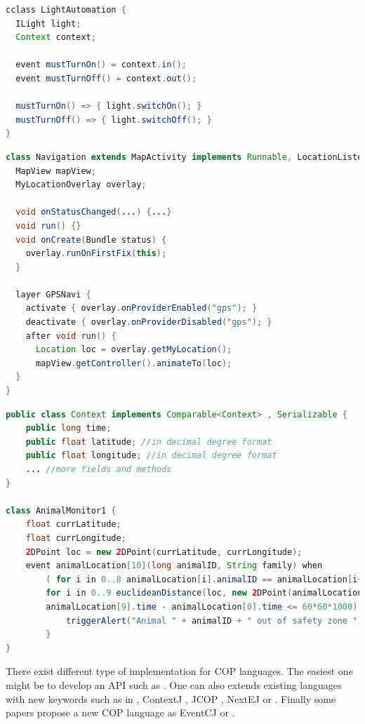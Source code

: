 \documentclass[a4paper]{article}
\begin{document}
\begin{lstlisting}[float, language=Java, caption=ECaesarJ context use, label={listing:ecaesarjcontextuse}]
cclass LightAutomation {
  ILight light;
  Context context;

  event mustTurnOn() = context.in();
  event mustTurnOff() = context.out();

  mustTurnOn() => { light.switchOn(); }
  mustTurnOff() => { light.switchOff(); }
}
\end{lstlisting}

\begin{lstlisting}[float, language=Java, caption=EventCJ context-dependent behaviour, label={listing:eventcjlayeruse}]
class Navigation extends MapActivity implements Runnable, LocationListener {
  MapView mapView;
  MyLocationOverlay overlay;
    
  void onStatusChanged(...) {...}
  void run() {}
  void onCreate(Bundle status) {
    overlay.runOnFirstFix(this);
  }
  
  layer GPSNavi {
    activate { overlay.onProviderEnabled("gps"); }
    deactivate { overlay.onProviderDisabled("gps"); }
    after void run() {
      Location loc = overlay.getMyLocation();
      mapView.getController().animateTo(loc);
  }
}
\end{lstlisting}

\begin{lstlisting}[float, language=Java, caption=EventJava context-dependent behaviour, label={listing:eventjavacontextuse}]
public class Context implements Comparable<Context> , Serializable {
	public long time;
	public float latitude; //in decimal degree format
	public float longitude; //in decimal degree format
	... //more fields and methods
}

class AnimalMonitor1 {
	float currLatitude;
	float currLongitude;
	2DPoint loc = new 2DPoint(currLatitude, currLongitude);
	event animalLocation[10](long animalID, String family) when
		( for i in 0..8 animalLocation[i].animalID == animalLocation[i+1].animalID &&
		for i in 0..9 euclideanDistance(loc, new 2DPoint(animalLocation[i].latitude, animalLocation[i].longitude)) > 0.5 &&
		animalLocation[9].time - animalLocation[0].time <= 60*60*1000) {
			triggerAlert("Animal " + animalID + " out of safety zone ");
		}
}
\end{lstlisting}

There exist different type of implementation for COP languages. The easiest one might be to develop an API such as \cite{appeltauer_dedicated_2008}. One can also extends existing languages with new keywords such as in \cite{clarke_semantics_2009}, ContextJ \cite{haupt_contextj:_2011}, JCOP \cite{appeltauer_declarative_2013}, NextEJ \cite{kamina_towards_2009} or \cite{ghezzi_context_2010}. Finally some papers propose a new COP language as  EventCJ \cite{kamina_eventcj:_2011} or \cite{kamina_unified_2013}.
\end{document}
